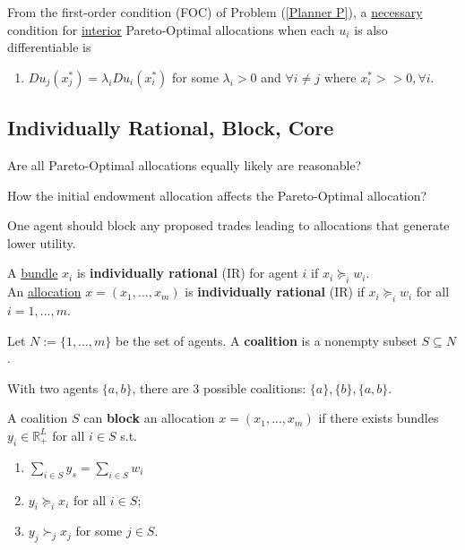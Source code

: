 \documentclass[11pt]{elegantbook}
\begin{document}
\begin{proposition}
    From the first-order condition (FOC) of Problem (\ref{Planner P}), a \underline{necessary} condition for \underline{interior} Pareto-Optimal allocations when each $u_i$ is also differentiable is
    \begin{enumerate}[$\circ$]
        \item $Du_j(x^*_j)=\lambda_i Du_i(x^*_i)$ for some $\lambda_i>0$ and $\forall i\neq j$ where $x^*_i>>0, \forall i$.
    \end{enumerate}
\end{proposition}


\subsection{Individually Rational, Block, Core}
Are all Pareto-Optimal allocations equally likely are reasonable?

How the initial endowment allocation affects the Pareto-Optimal allocation?

One agent should block any proposed trades leading to allocations that generate lower utility.

\begin{definition}
    \normalfont
    A \underline{bundle} $x_i$ is \textbf{individually rational} (IR) for agent $i$ if $x_i\succeq_i w_i$.\\
    An \underline{allocation} $x=(x_1,...,x_m)$ is \textbf{individually rational} (IR) if $x_i\succeq_i w_i$ for all $i=1,...,m$.
\end{definition}

Let $N:=\{1,...,m\}$ be the set of agents. A \textbf{coalition} is a nonempty subset $S\subseteq N$.
\begin{example}
    With two agents $\{a,b\}$, there are 3 possible coalitions: $\{a\},\{b\},\{a,b\}$.
\end{example}

\begin{definition}[Block]
    \normalfont
    A coalition $S$ can \textbf{block} an allocation $x=(x_1,...,x_m)$ if there exists bundles $y_i\in \mathbb{R}^L_+$ for all $i\in S$ s.t.
    \begin{enumerate}[1.]
        \item $\sum_{i\in S}y_s=\sum_{i\in S}w_i$
        \item $y_i\succeq_i x_i$ for all $i\in S$;
        \item $y_j\succ_j x_j$ for some $j\in S$.
    \end{enumerate}
\end{definition}
\end{document}
